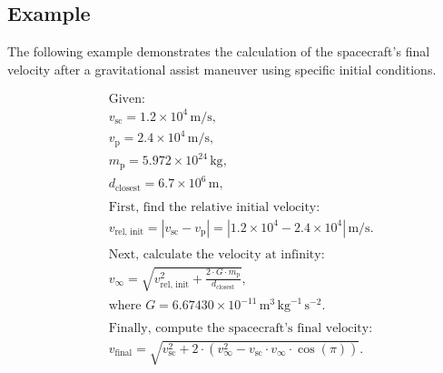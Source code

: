 \subsection{Example}
The following example demonstrates the calculation of the spacecraft's final velocity after a gravitational assist maneuver using specific initial conditions.

\begin{align*}
    &\text{Given}: \\
    &v_{\text{sc}} = 1.2 \times 10^4 \, \text{m/s}, \\
    &v_{\text{p}} = 2.4 \times 10^4 \, \text{m/s}, \\
    &m_{\text{p}} = 5.972 \times 10^{24} \, \text{kg}, \\
    &d_{\text{closest}} = 6.7 \times 10^6 \, \text{m}, \\
    \\
    &\text{First, find the relative initial velocity:} \\
    &v_{\text{rel, init}} = |v_{\text{sc}} - v_{\text{p}}| = |1.2 \times 10^4 - 2.4 \times 10^4| \, \text{m/s}. \\
    \\
    &\text{Next, calculate the velocity at infinity:} \\
    &v_{\infty} = \sqrt{v_{\text{rel, init}}^2 + \frac{2 \cdot G \cdot m_{\text{p}}}{d_{\text{closest}}}}, \\
    &\text{where } G = 6.67430 \times 10^{-11} \, \text{m}^3 \, \text{kg}^{-1} \, \text{s}^{-2}. \\
    \\
    &\text{Finally, compute the spacecraft's final velocity:} \\
    &v_{\text{final}} = \sqrt{v_{\text{sc}}^2 + 2 \cdot (v_{\infty}^2 - v_{\text{sc}} \cdot v_{\infty} \cdot \cos(\pi))}.
\end{align*}